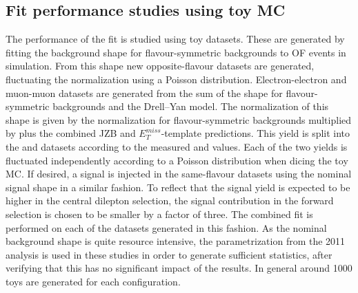 \subsection{Fit performance studies using toy MC}
\label{sec:toys}
The performance of the fit is studied using toy datasets. These are generated by fitting the background shape for flavour-symmetric backgrounds to OF events in simulation. From this shape new opposite-flavour datasets are generated, fluctuating the normalization using a Poisson distribution. Electron-electron and muon-muon datasets are generated from the sum of the  shape for flavour-symmetric backgrounds and the Drell--Yan model. The normalization of this shape is given by the normalization for flavour-symmetric backgrounds multiplied by \Rsfof plus the combined JZB and $E_T^{miss}$-template predictions. This yield is split into the \EE and \MM datasets according to the measured \Reeof and \Rmmof values. Each of the two yields is fluctuated independently according to a Poisson distribution when dicing the toy MC. If desired, a signal is injected in the same-flavour datasets using the nominal signal shape in a similar fashion. To reflect that the signal yield is expected to be higher in the central dilepton selection, the signal contribution in the forward selection is chosen to be smaller by a factor of three. The combined fit is performed on each of the datasets generated in this fashion. As the nominal background shape is quite resource intensive, the parametrization from the 2011 analysis is used in these studies in order to generate sufficient statistics, after verifying that this has no significant impact of the results. In general around 1000 toys are generated for each configuration.
